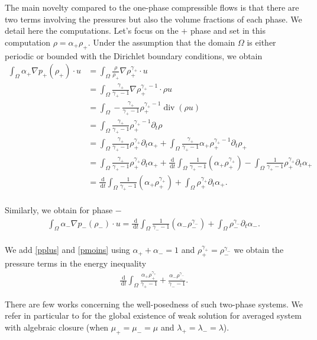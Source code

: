 \documentclass[11pt, twoside, a4paper]{article}
\theoremstyle{plain}
\theoremstyle{remark}
\numberwithin{equation}{section}
\newcommand{\dd}{\,\mathrm{d}}
\renewcommand{\div}{\operatorname{div}}
\newcommand{\dt}{\partial_t}
\newcommand{\ap}{\alpha_+}
\newcommand{\am}{\alpha_-}
\newcommand{\rp}{\rho_+}
\newcommand{\rmi}{\rho_-}
\newcommand{\gp}{\gamma_{+}}
\newcommand{\gm}{\gamma_-}
\begin{document}
The main novelty compared to the one-phase compressible flows is that there are two terms involving the pressures but also the volume fractions of each phase. We detail here the computations. Let's focus on the $+$ phase and set in this computation $\rho=\ap \rp$. Under the assumption that the domain $\Omega$ is either periodic or bounded with the Dirichlet boundary conditions, we obtain
\begin{align}
    \int_\Omega \ap \nabla p_+(\rp) \cdot u &= \int_\Omega \frac{\rho}{\rp} \nabla \rp^{\gp} \cdot u \nonumber \\
    &= \int_\Omega \frac{\gp}{\gp-1} \nabla \rp^{\gp-1} \cdot \rho u\nonumber\\
    &= \int_\Omega - \frac{\gp}{\gp-1} \rp^{\gp-1} \div(\rho u)\nonumber\\
    &= \int_\Omega \frac{\gp}{\gp-1} \rp^{\gp-1} \dt \rho\nonumber\\
    &= \int_\Omega \frac{\gp}{\gp-1} \rp^{\gp} \dt \ap + \int_\Omega \frac{\gp}{\gp-1} \ap \rp^{\gp-1} \dt \rp\nonumber\\
    &= \int_\Omega \frac{\gp}{\gp-1} \rp^{\gp} \dt \ap + \frac{\dd}{\dd t} \int_\Omega \frac{1}{\gp-1} (\ap \rp^{\gp}) - \int_\Omega \frac{1}{\gp-1} \rp^{\gp} \dt \ap\nonumber\\
    &= \frac{\dd}{\dd t} \int_\Omega \frac{1}{\gp-1} (\ap \rp^{\gp}) + \int_\Omega \rp^{\gp} \dt \ap.\label{pplus}\\ \nonumber
\end{align}

Similarly, we obtain for phase $-$
\begin{align}
    \int_\Omega \am \nabla p_-(\rmi) \cdot u = \frac{\dd}{\dd t} \int_\Omega \frac{1}{\gm-1} (\am \rmi^{\gm}) + \int_\Omega \rmi^{\gm} \dt \am.\label{pmoins}\\ \nonumber
\end{align}

We add \eqref{pplus} and \eqref{pmoins} using $\ap + \am =1$ and $\rp^{\gp} = \rmi^{\gm}$ we obtain the pressure terms in the energy inequality
\begin{align*}
    \frac{\dd}{\dd t} \int_\Omega \frac{\ap \rp^{\gp}}{\gp-1} + \frac{\am \rmi^{\gm}}{\gm-1}.
\end{align*}

There are few works concerning the well-posedness of such two-phase systems. We refer in particular to \cite{novotny2020weak} for the global existence of weak solution for averaged system with algebraic closure (when $\mu_+=\mu_-=\mu$ and $\lambda_+=\lambda_-=\lambda$).
\end{document}
